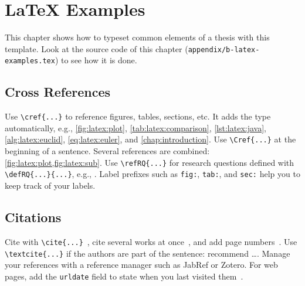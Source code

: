 \chapter{LaTeX Examples}\label{chap:appendix:latex}

This chapter shows how to typeset common elements of a thesis with this template.
Look at the source code of this chapter (\texttt{appendix/b-latex-examples.tex}) to see how it is done.

\section{Cross References}\label{sec:latex:references}

Use \verb|\cref{...}| to reference figures, tables, sections, etc.
It adds the type automatically, e.g., \cref{fig:latex:plot}, \cref{tab:latex:comparison}, \cref{lst:latex:java}, \cref{alg:latex:euclid}, \cref{eq:latex:euler}, and \cref{chap:introduction}.
Use \verb|\Cref{...}| at the beginning of a sentence.
Several references are combined: \cref{fig:latex:plot,fig:latex:sub}.
Use \verb|\refRQ{...}| for research questions defined with \verb|\defRQ{...}{...}|, e.g., .
Label prefixes such as \texttt{fig:}, \texttt{tab:}, and \texttt{sec:} help you to keep track of your labels.

\section{Citations}\label{sec:latex:citations}

Cite with \verb|\cite{...}|~\cite{Lamport1994}, cite several works at once~\cite{Basili1994,Runeson2009}, and add page numbers~\cite[p.~42]{Lamport1994}.
Use \verb|\textcite{...}| if the authors are part of the sentence: \textcite{Runeson2009} recommend \ldots.
Manage your references with a reference manager such as JabRef or Zotero.
For web pages, add the \texttt{urldate} field to state when you last visited them~\cite{ISDO}.

